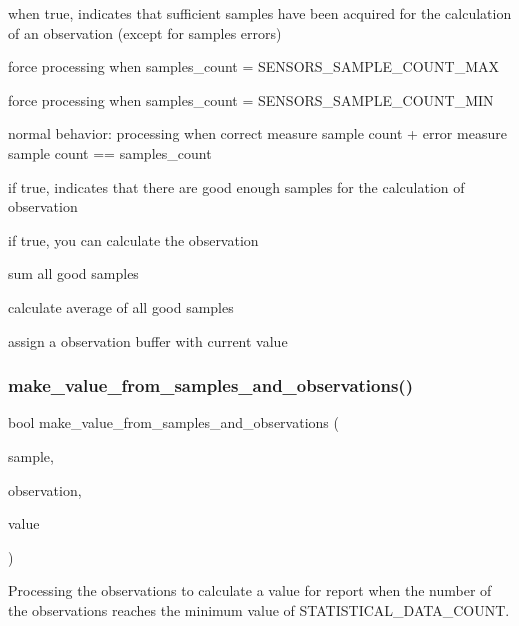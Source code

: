 when true, indicates that sufficient samples have been acquired for the calculation of an observation (except for samples errors)

force processing when samples\+\_\+count = S\+E\+N\+S\+O\+R\+S\+\_\+\+S\+A\+M\+P\+L\+E\+\_\+\+C\+O\+U\+N\+T\+\_\+\+M\+AX

force processing when samples\+\_\+count = S\+E\+N\+S\+O\+R\+S\+\_\+\+S\+A\+M\+P\+L\+E\+\_\+\+C\+O\+U\+N\+T\+\_\+\+M\+IN

normal behavior\+: processing when correct measure sample count + error measure sample count == samples\+\_\+count

if true, indicates that there are good enough samples for the calculation of observation

if true, you can calculate the observation

sum all good samples

calculate average of all good samples

assign a observation buffer with current value \mbox{\label{i2c-th_8h_ab301e4d552826ef91458f52963949a1d}} 
\subsubsection{\texorpdfstring{make\+\_\+value\+\_\+from\+\_\+samples\+\_\+and\+\_\+observations()}{make\_value\_from\_samples\_and\_observations()}}
{\footnotesize\ttfamily bool make\+\_\+value\+\_\+from\+\_\+samples\+\_\+and\+\_\+observations (\begin{DoxyParamCaption}\item[{\hyperlink{structsample__t}{sample\+\_\+t} $\ast$}]{sample,  }\item[{\hyperlink{structobservation__t}{observation\+\_\+t} $\ast$}]{observation,  }\item[{volatile value\+\_\+t $\ast$}]{value }\end{DoxyParamCaption})}



Processing the observations to calculate a value for report when the number of the observations reaches the minimum value of S\+T\+A\+T\+I\+S\+T\+I\+C\+A\+L\+\_\+\+D\+A\+T\+A\+\_\+\+C\+O\+U\+NT. 


